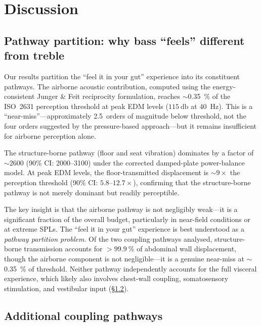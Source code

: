 \section{Discussion}
\label{sec:discussion}

\subsection{Pathway partition: why bass ``feels'' different from treble}
\label{sec:why-bass-feels}

Our results partition the ``feel it in your gut'' experience into its
constituent pathways.  The airborne acoustic contribution, computed using
the energy-consistent Junger \& Feit reciprocity formulation, reaches
$\sim$\SI{0.35}{\percent} of the ISO~2631 perception threshold at peak
EDM levels ($\SI{115}{\decibel}$ at \SI{40}{\hertz}).  This is a
``near-miss''---approximately \num{2.5}~orders of magnitude below threshold, not the
four orders suggested by the pressure-based approach---but it remains
insufficient for airborne perception alone.

The structure-borne pathway (floor and seat vibration) dominates by a
factor of ${\sim}\num{2600}$ (90\% CI: \numrange{2000}{3100}) under the
corrected damped-plate power-balance model.  At peak EDM levels, the
floor-transmitted displacement is $\sim 9\times$ the perception
threshold (90\% CI: $5.8$--$12.7\times$), confirming that the
structure-borne pathway is not merely dominant but readily perceptible.

The key insight is that the airborne pathway is not negligibly weak---it
is a significant fraction of the overall budget, particularly in
near-field conditions or at extreme SPLs.  The ``feel it in your gut''
experience is best understood as a \emph{pathway partition problem}.
Of the two coupling pathways analysed, structure-borne transmission
accounts for $>\SI{99.9}{\percent}$ of abdominal wall displacement,
though the airborne component is not negligible---it is a genuine
near-miss at $\sim$\SI{0.35}{\percent} of threshold.  Neither pathway
independently accounts for the full visceral experience, which
likely also involves chest-wall coupling, somatosensory stimulation,
and vestibular input (\S\ref{sec:additional-pathways}).

\subsection{Additional coupling pathways}
\label{sec:additional-pathways}

